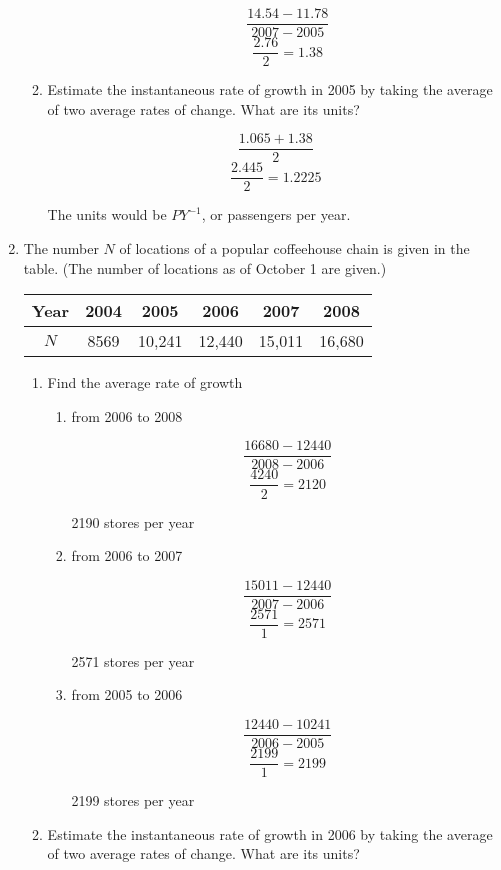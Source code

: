 \documentclass{article}
\begin{document}
\begin{enumerate}
\begin{enumerate}
\begin{enumerate}
				$$\frac{14.54 - 11.78}{2007 - 2005}$$
				$$\frac{2.76}{2} = 1.38$$
			\end{enumerate}

			\item Estimate the instantaneous rate of growth in 2005 by
				taking the average of two average rates of change.
				What are its units?

					$$\frac{1.065 + 1.38}{2}$$
					$$\frac{2.445}{2} = 1.2225$$

				The units would be $P Y^{-1}$, or passengers per year.

		\end{enumerate}	

		\item The number $N$ of locations of a popular coffeehouse chain is given
			in the table. (The number of locations as of October 1 are given.)

			\begin{tabular}{|c|c|c|c|c|c|}
				\hline
				Year & 2004 & 2005 & 2006 & 2007 & 2008 \\ \hline
				$N$ & 8569 & 10,241 & 12,440 & 15,011 & 16,680 \\ \hline
			\end{tabular}

			\begin{enumerate}
				\item Find the average rate of growth

				\begin{enumerate}
					\item from 2006 to 2008

						$$\frac{16680 - 12440}{2008 - 2006}$$
						$$\frac{4240}{2} = 2120$$

						2190 stores per year

					\item from 2006 to 2007

						$$\frac{15011 - 12440}{2007 - 2006}$$
						$$\frac{2571}{1} = 2571$$

						2571 stores per year
					\item from 2005 to 2006

						$$\frac{12440 - 10241}{2006 - 2005}$$
						$$\frac{2199}{1} = 2199$$

						2199 stores per year
				\end{enumerate}

				\item Estimate the instantaneous rate of growth in 2006 by
					taking the average of two average rates of change.
					What are its units?


\end{enumerate}
\end{enumerate}
\end{document}
